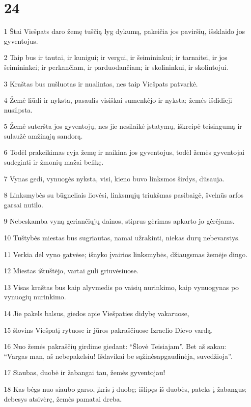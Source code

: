 \chapter{24}


\par 1 Štai Viešpats daro žemę tuščią lyg dykumą, pakeičia jos paviršių, išsklaido jos gyventojus. 
\par 2 Taip bus ir tautai, ir kunigui; ir vergui, ir šeimininkui; ir tarnaitei, ir jos šeimininkei; ir perkančiam, ir parduodančiam; ir skolininkui, ir skolintojui. 
\par 3 Kraštas bus nušluotas ir nualintas, nes taip Viešpats patvarkė. 
\par 4 Žemė liūdi ir nyksta, pasaulis visiškai sumenkėjo ir nyksta; žemės išdidieji nusilpsta. 
\par 5 Žemė suteršta jos gyventojų, nes jie nesilaikė įstatymų, iškreipė teisingumą ir sulaužė amžinąją sandorą. 
\par 6 Todėl prakeikimas ryja žemę ir naikina jos gyventojus, todėl žemės gyventojai sudeginti ir žmonių mažai belikę. 
\par 7 Vynas gedi, vynuogės nyksta, visi, kieno buvo linksmos širdys, dūsauja. 
\par 8 Linksmybės su būgneliais liovėsi, linksmųjų triukšmas pasibaigė, švelnūs arfos garsai nutilo. 
\par 9 Nebeskamba vyną geriančiųjų dainos, stiprus gėrimas apkarto jo gėrėjams. 
\par 10 Tuštybės miestas bus sugriautas, namai užrakinti, niekas durų nebevarstys. 
\par 11 Verkia dėl vyno gatvėse; išnyko įvairios linksmybės, džiaugsmas žemėje dingo. 
\par 12 Miestas ištuštėjo, vartai guli griuvėsiuose. 
\par 13 Visas kraštas bus kaip alyvmedis po vaisių nurinkimo, kaip vynuogynas po vynuogių nurinkimo. 
\par 14 Jie pakels balsus, giedos apie Viešpaties didybę vakaruose, 
\par 15 šlovins Viešpatį rytuose ir jūros pakraščiuose Izraelio Dievo vardą. 
\par 16 Nuo žemės pakraščių girdime giedant: “Šlovė Teisiajam”. Bet aš sakau: “Vargas man, aš nebepakelsiu! Išdavikai be sąžinės­apgaudinėja, suvedžioja”. 
\par 17 Siaubas, duobė ir žabangai tau, žemės gyventojau! 
\par 18 Kas bėgs nuo siaubo garso, įkris į duobę; išlipęs iš duobės, pateks į žabangus; debesys atsivėrę, žemės pamatai dreba. 
